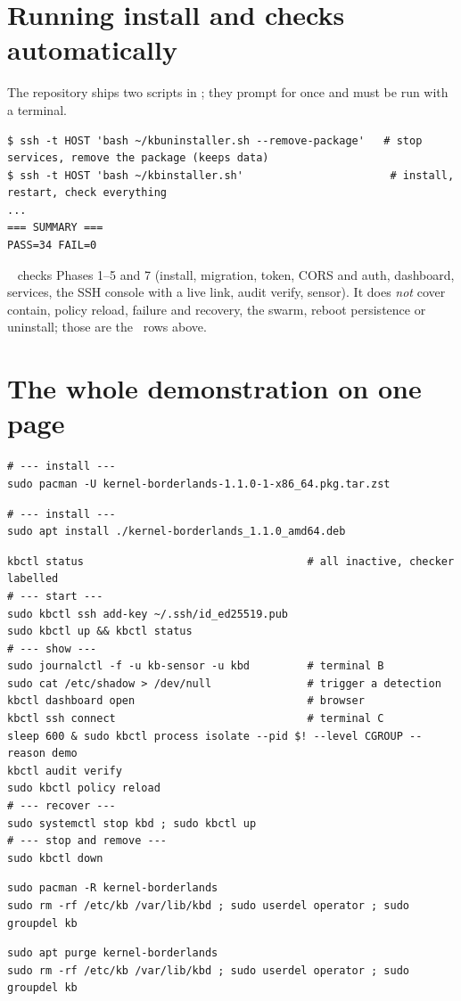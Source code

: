 \section{Running install and checks automatically}
\label{sec:rb-auto}
The repository ships two scripts in ; they prompt for  once and must be run with a terminal.
\begin{lstlisting}[style=console]
$ ssh -t HOST 'bash ~/kbuninstaller.sh --remove-package'   # stop services, remove the package (keeps data)
$ ssh -t HOST 'bash ~/kbinstaller.sh'                       # install, restart, check everything
...
=== SUMMARY ===
PASS=34 FAIL=0
\end{lstlisting}
\verified\  checks Phases 1--5 and 7 (install, migration, token, CORS and auth, dashboard, services, the SSH console with a live
 link, audit verify, sensor). It does \emph{not} cover contain, policy reload, failure and recovery, the swarm, reboot persistence or
uninstall; those are the \notrun\ rows above.

\section{The whole demonstration on one page}
\ifarch
\begin{lstlisting}[style=console]
# --- install ---
sudo pacman -U kernel-borderlands-1.1.0-1-x86_64.pkg.tar.zst
\end{lstlisting}
\else
\begin{lstlisting}[style=console]
# --- install ---
sudo apt install ./kernel-borderlands_1.1.0_amd64.deb
\end{lstlisting}
\fi
\begin{lstlisting}[style=console]
kbctl status                                   # all inactive, checker labelled
# --- start ---
sudo kbctl ssh add-key ~/.ssh/id_ed25519.pub
sudo kbctl up && kbctl status
# --- show ---
sudo journalctl -f -u kb-sensor -u kbd         # terminal B
sudo cat /etc/shadow > /dev/null               # trigger a detection
kbctl dashboard open                           # browser
kbctl ssh connect                              # terminal C
sleep 600 & sudo kbctl process isolate --pid $! --level CGROUP --reason demo
kbctl audit verify
sudo kbctl policy reload
# --- recover ---
sudo systemctl stop kbd ; sudo kbctl up
# --- stop and remove ---
sudo kbctl down
\end{lstlisting}
\ifarch
\begin{lstlisting}[style=console]
sudo pacman -R kernel-borderlands
sudo rm -rf /etc/kb /var/lib/kbd ; sudo userdel operator ; sudo groupdel kb
\end{lstlisting}
\else
\begin{lstlisting}[style=console]
sudo apt purge kernel-borderlands
sudo rm -rf /etc/kb /var/lib/kbd ; sudo userdel operator ; sudo groupdel kb
\end{lstlisting}
\fi
